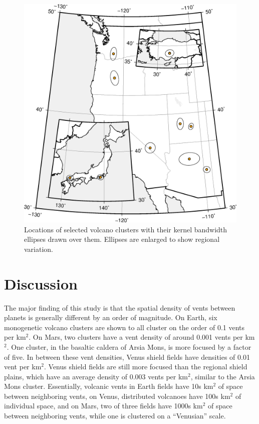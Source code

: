 \documentclass[12pt,letter]{article}
\begin{document}
\begin{figure}
\centering
\includegraphics[width=0.5\linewidth]{figures/locators/earth_locator.png}
\caption{Locations of selected volcano clusters with their kernel bandwidth ellipses drawn over them. Ellipses are enlarged to show regional variation.}
\label{fig_earthlocator}
\end{figure}

\section{Discussion}
The major finding of this study is that the spatial density of vents between planets is generally different by an order of magnitude. On Earth, six monogenetic volcano clusters are shown to all cluster on the order of 0.1 vents per km$^2$. On Mars, two clusters have a vent density of around 0.001 vents per km$^2$. One cluster, in the basaltic caldera of Arsia Mons, is more focused by a factor of five. In between these vent densities, Venus shield fields have densities of 0.01 vent per km$^2$. Venus shield fields are still more focused than the regional shield plains, which have an average density of 0.003 vents per km$^2$, similar to the Arsia Mons cluster. Essentially, volcanic vents in Earth fields have 10s km$^2$ of space between neighboring vents, on Venus, distributed volcanoes have 100s km$^2$ of individual space, and on Mars, two of three fields have 1000s  km$^2$ of space between neighboring vents, while one is clustered on a ``Venusian'' scale.
\end{document}
